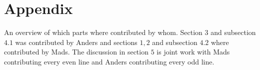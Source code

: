 \section*{Appendix}
\label{sec:appendix}

An overview of which parts where contributed by whom. Section $3$ and subsection $4.1$ was contributed by Anders and sections $1, 2$ and subsection $4.2$ where contributed by Mads. The discussion in section $5$ is joint work with Mads contributing every even line and Anders contributing every odd line.